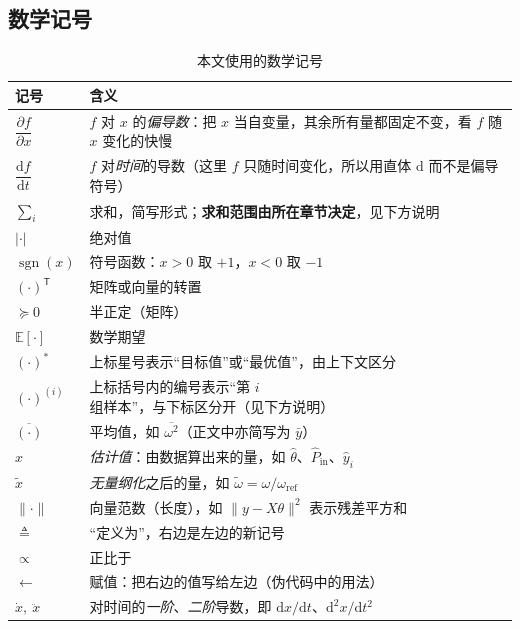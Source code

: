 \documentclass[cn,blue,11pt,device=normal]{elegantnote}
\newcommand{\Pin}{P_{\mathrm{in}}{}}
\newcommand{\dd}{\mathrm{d}}
\begin{document}
\subsection{数学记号}

\begin{table}[htbp]
  \centering
  \small
  \caption{本文使用的数学记号}
  \label{tab:sym-math}
  \begin{tabular}{@{}>{\raggedright\arraybackslash}p{}>{\raggedright\arraybackslash}p{}@{}}
    \toprule
    记号 & 含义 \\
    \midrule
    $\dfrac{\partial f}{\partial x}$ & $f$ 对 $x$ 的\emph{偏导数}：把 $x$ 当自变量，其余所有量都固定不变，看 $f$ 随 $x$ 变化的快慢 \\
    $\dfrac{\dd f}{\dd t}$ & $f$ 对\emph{时间}的导数（这里 $f$ 只随时间变化，所以用直体 $\dd$ 而不是偏导符号） \\
    $\sum_i$ & 求和，简写形式；\textbf{求和范围由所在章节决定}，见下方说明 \\
    $\lvert\cdot\rvert$ & 绝对值 \\
    $\operatorname{sgn}(x)$ & 符号函数：$x>0$ 取 $+1$，$x<0$ 取 $-1$ \\
    $(\cdot)^{\mathsf T}$ & 矩阵或向量的转置 \\
    $\succeq 0$ & 半正定（矩阵） \\
    $\mathbb{E}[\cdot]$ & 数学期望 \\
    $(\cdot)^{\ast}$ & 上标星号表示“目标值”或“最优值”，由上下文区分 \\
    $(\cdot)^{(i)}$ & 上标括号内的编号表示“第 $i$ 组样本”，与下标区分开（见下方说明） \\
    $\overline{(\cdot)}$ & 平均值，如 $\overline{\omega^{2}}$（正文中亦简写为 $\bar y$） \\
    $\hat{x}$        & \emph{估计值}：由数据算出来的量，如 $\hat\theta$、$\hat\Pin$、$\hat y_i$ \\
    $\tilde{x}$      & \emph{无量纲化}之后的量，如 $\tilde\omega=\omega/\omega_{\mathrm{ref}}$ \\
    $\lVert\cdot\rVert$ & 向量范数（长度），如 $\lVert y-X\theta\rVert^{2}$ 表示残差平方和 \\
    $\triangleq$     & “定义为”，右边是左边的新记号 \\
    $\propto$        & 正比于 \\
    $\leftarrow$     & 赋值：把右边的值写给左边（伪代码中的用法） \\
    $\dot{x},\ \ddot{x}$ & 对时间的\emph{一阶}、\emph{二阶}导数，即 $\dd x/\dd t$、$\dd^{2}x/\dd t^{2}$ \\

\end{tabular}
\end{table}
\end{document}
